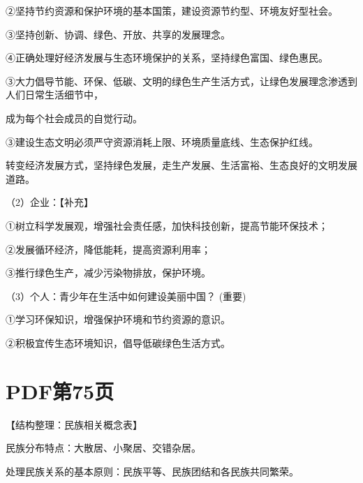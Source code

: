 \documentclass[lang=cn,11pt]{elegantbook}
\newcommand{\daofasym}[1]{{\daofasymbolfont #1}}
\newcommand{\daofasym}[1]{#1}
\begin{document}
\daofasym{②}坚持节约资源和保护环境的基本国策，建设资源节约型、环境友好型社会。\par

\daofasym{③}坚持创新、协调、绿色、开放、共享的发展理念。\par

\daofasym{④}正确处理好经济发展与生态环境保护的关系，坚持绿色富国、绿色惠民。\par

\daofasym{③}大力倡导节能、环保、低碳、文明的绿色生产生活方式，让绿色发展理念渗透到人们日常生活细节中，\par

成为每个社会成员的自觉行动。\par

\daofasym{③}建设生态文明必须严守资源消耗上限、环境质量底线、生态保护红线。\par

转变经济发展方式，坚持绿色发展，走生产发展、生活富裕、生态良好的文明发展道路。\par

（2）企业：【补充】\par

\daofasym{①}树立科学发展观，增强社会责任感，加快科技创新，提高节能环保技术；\par

\daofasym{②}发展循环经济，降低能耗，提高资源利用率；\par

\daofasym{③}推行绿色生产，减少污染物排放，保护环境。\par

（3）个人：青少年在生活中如何建设美丽中国？ (重要)\par

\daofasym{①}学习环保知识，增强保护环境和节约资源的意识。\par

\daofasym{②}积极宜传生态环境知识，倡导低碳绿色生活方式。\par


\section*{PDF第75页}

【结构整理：民族相关概念表】\par

民族分布特点：大散居、小聚居、交错杂居。\par

处理民族关系的基本原则：民族平等、民族团结和各民族共同繁荣。\par
\end{document}
